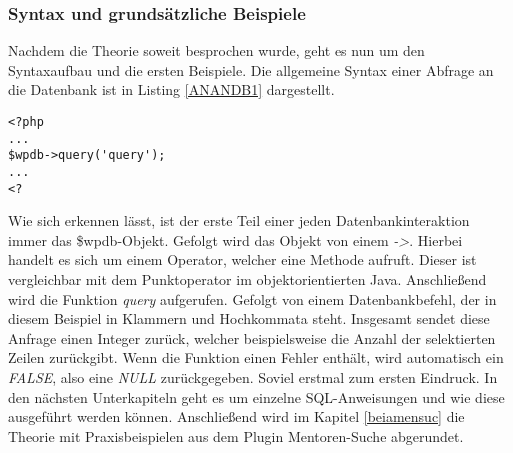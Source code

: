 \subsubsection{Syntax und grundsätzliche Beispiele}\label{sygrbei}
Nachdem die Theorie soweit besprochen wurde, geht es nun um den Syntaxaufbau und die ersten Beispiele. \newline
Die allgemeine Syntax einer Abfrage an die Datenbank ist in Listing \ref{ANANDB1} dargestellt.
\begin{lstlisting}
<?php
...
$wpdb->query('query');
...
<?
\end{lstlisting}
Wie sich erkennen lässt, ist der erste Teil einer jeden Datenbankinteraktion immer das \$wpdb-Objekt. Gefolgt wird das Objekt von einem \emph{->}. Hierbei handelt es sich um einem Operator, welcher eine Methode aufruft. Dieser ist vergleichbar mit dem Punktoperator im objektorientierten Java. Anschließend wird die Funktion \emph{query} aufgerufen. Gefolgt von einem Datenbankbefehl, der in diesem Beispiel in Klammern und Hochkommata steht. Insgesamt sendet diese Anfrage einen Integer zurück, welcher beispielsweise die Anzahl der selektierten Zeilen zurückgibt. Wenn die Funktion einen Fehler enthält, wird automatisch ein \emph{FALSE}, also eine \emph{NULL} zurückgegeben. \newline
Soviel erstmal zum ersten Eindruck. In den nächsten Unterkapiteln geht es um einzelne SQL-Anweisungen und wie diese ausgeführt werden können. Anschließend wird im Kapitel \ref{beiamensuc} die Theorie mit Praxisbeispielen aus dem Plugin Mentoren-Suche abgerundet. 
